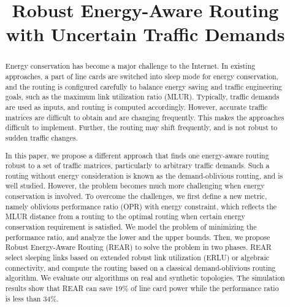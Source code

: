 \documentclass[conference]{IEEEtran}
\begin{document}
\title{Robust Energy-Aware Routing with Uncertain Traffic Demands}


\author{
\and
{}
\and
{}
}


\maketitle

\begin{abstract}
Energy conservation has become a major challenge to the Internet. In existing approaches, a part of line cards 
are switched into sleep mode for energy conservation, and the routing is configured carefully to balance energy saving 
and traffic engineering goals, such as the maximum link utilization ratio (MLUR). Typically, traffic demands are 
used as inputs, and routing is computed accordingly. However, accurate traffic matrices are difficult to obtain and 
are changing frequently. This makes the approaches difficult to implement. Further, the routing may shift 
frequently, and is not robust to sudden traffic changes.

In this paper, we propose a different approach that finds one energy-aware routing robust to a set of traffic 
matrices, particularly to arbitrary traffic demands. Such a routing without energy consideration is known as 
the demand-oblivious routing, and is well studied. However, the problem becomes much more challenging when energy 
conservation is involved. To overcome the challenges, we first define a new metric, namely oblivious performance 
ratio (OPR) with energy constraint, which reflects the MLUR distance from a routing to the optimal routing when 
certain energy conservation requirement is satisfied. We model the problem of minimizing the performance ratio, 
and analyze the lower and the upper bounds. Then, we propose Robust Energy-Aware Routing (REAR) to solve 
the problem in two phases. REAR select sleeping links based on extended robust link utilization (ERLU) or algebraic 
connectivity, and compute the routing based on a classical demand-oblivious routing algorithm. 
We evaluate our algorithms on real and synthetic topologies. The simulation results show that REAR can save 
19\% of line card power while the performance ratio is less than 34\%.
\end{abstract}
\end{document}
